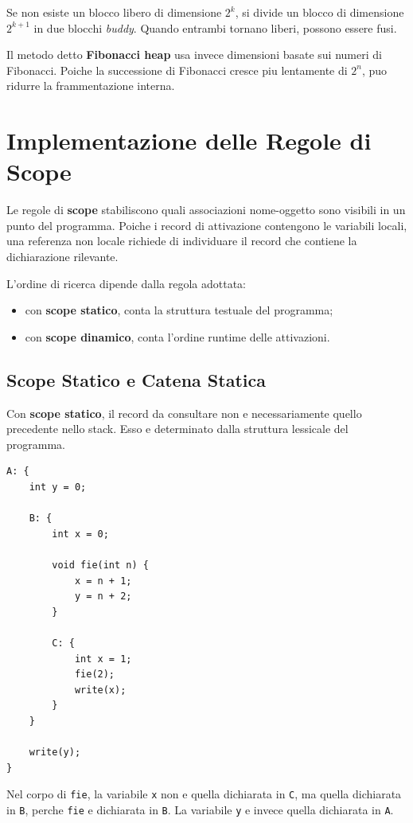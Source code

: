 \documentclass{article}
\begin{document}
Se non esiste un blocco libero di dimensione $2^k$, si divide un blocco di dimensione $2^{k+1}$ in due blocchi \textit{buddy}. Quando entrambi tornano liberi, possono essere fusi.

Il metodo detto \textbf{Fibonacci heap} usa invece dimensioni basate sui numeri di Fibonacci. Poiche la successione di Fibonacci cresce piu lentamente di $2^n$, puo ridurre la frammentazione interna.

\section{Implementazione delle Regole di Scope}

Le regole di \textbf{scope} stabiliscono quali associazioni nome-oggetto sono visibili in un punto del programma. Poiche i record di attivazione contengono le variabili locali, una referenza non locale richiede di individuare il record che contiene la dichiarazione rilevante.

L'ordine di ricerca dipende dalla regola adottata:

\begin{itemize}
  \item con \textbf{scope statico}, conta la struttura testuale del programma;
  \item con \textbf{scope dinamico}, conta l'ordine runtime delle attivazioni.
\end{itemize}

\subsection{Scope Statico e Catena Statica}

Con \textbf{scope statico}, il record da consultare non e necessariamente quello precedente nello stack. Esso e determinato dalla struttura lessicale del programma.

\begin{lstlisting}
A: {
    int y = 0;

    B: {
        int x = 0;

        void fie(int n) {
            x = n + 1;
            y = n + 2;
        }

        C: {
            int x = 1;
            fie(2);
            write(x);
        }
    }

    write(y);
}
\end{lstlisting}

Nel corpo di \texttt{fie}, la variabile \texttt{x} non e quella dichiarata in \texttt{C}, ma quella dichiarata in \texttt{B}, perche \texttt{fie} e dichiarata in \texttt{B}. La variabile \texttt{y} e invece quella dichiarata in \texttt{A}.
\end{document}
